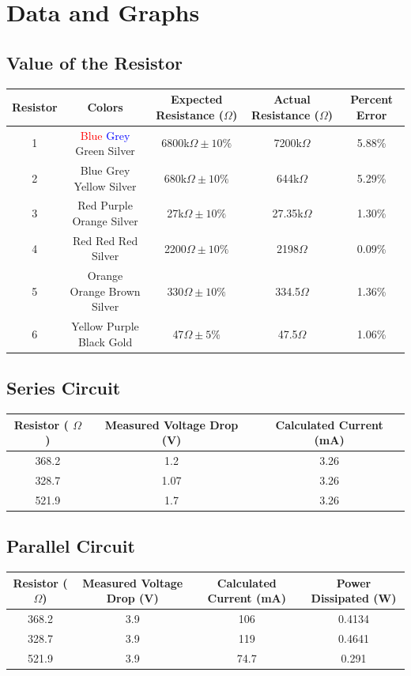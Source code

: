\documentclass[titlepage]{article}
\begin{document}
	\section{Data and Graphs}
	\subsection{Value of the Resistor}
		\begin{center}
		\begin{tabular}{c|c|c|c|c}
			Resistor & Colors & Expected Resistance (\(\Omega\)) & Actual Resistance (\(\Omega\)) & Percent Error \\
			\hline
			1 &\textcolor{red}{ Blue} \textcolor{blue}{ Grey} Green Silver & 6800k\(\Omega \pm 10\%\) & 7200k\(\Omega\) & 5.88\% \\
			2 & Blue Grey Yellow Silver & 680k\(\Omega \pm 10\%\) & 644k\(\Omega\) & 5.29\% \\
			3 & Red Purple Orange Silver & 27k\(\Omega \pm 10\%\) & 27.35k\(\Omega\) & 1.30\% \\
			4 & Red Red Red Silver & 2200\(\Omega \pm 10\%\) & 2198\(\Omega\) & 0.09\% \\
			5 & Orange Orange Brown Silver & 330\(\Omega \pm 10\%\) & 334.5\(\Omega\) & 1.36\% \\
			6 & Yellow Purple Black Gold & 47\(\Omega \pm 5\%\) & 47.5\(\Omega\) & 1.06\% \\
			
		\end{tabular}
	\end{center}
	\subsection{Series Circuit} 
		\begin{center}
		\begin{tabular}{c|c|c}
			Resistor ( \(\Omega\)) & Measured Voltage Drop (V) & Calculated Current (mA) \\
			\hline
			368.2 & 1.2 & 3.26\\
			328.7 & 1.07 & 3.26\\
			521.9 & 1.7 & 3.26
		\end{tabular}
	\end{center}
	\subsection{Parallel Circuit}
		\begin{center}
		\begin{tabular}{c|c|c|c}
			Resistor (\(\Omega\)) & Measured Voltage Drop (V) & Calculated Current (mA) & Power Dissipated (W)\\
			\hline
			368.2 & 3.9 & 106 & 0.4134\\
			328.7 & 3.9 & 119 & 0.4641\\
			521.9 & 3.9 & 74.7 & 0.291
		\end{tabular}
	\end{center}
\end{document}
